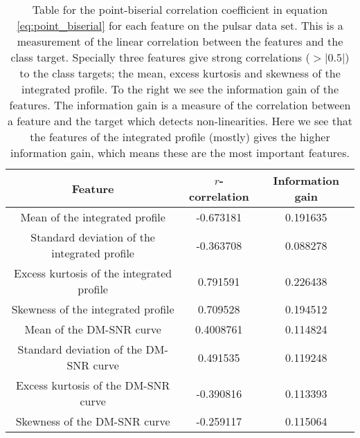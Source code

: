\documentclass[12pt,a4paper,english]{article}
\begin{document}
\begin{table}[htbp!]
	\centering
	\begin{tabular}{ |c|c|c| }
		\hline \rule{0pt}{13pt}
		Feature & $r$-correlation & Information gain \\
		\hline \rule{0pt}{13pt}
		Mean of the integrated profile & -0.673181 & 0.191635 \\
		\hline \rule{0pt}{13pt}
		Standard deviation of the integrated profile & -0.363708 & 0.088278 \\
		\hline \rule{0pt}{13pt}
		Excess kurtosis of the integrated profile & 0.791591 & 0.226438 \\
		\hline \rule{0pt}{13pt}
		Skewness of the integrated profile & 0.709528 & 0.194512 \\
		\hline \rule{0pt}{13pt}
		Mean of the DM-SNR curve & 0.4008761 & 0.114824 \\
		\hline \rule{0pt}{13pt}
		Standard deviation of the DM-SNR curve & 0.491535 & 0.119248 \\
		\hline \rule{0pt}{13pt}
		Excess kurtosis of the DM-SNR curve & -0.390816 & 0.113393 \\
		\hline \rule{0pt}{13pt}
		Skewness of the DM-SNR curve & -0.259117 &0.115064 \\
		\hline
	\end{tabular}	
	\caption{Table for the point-biserial correlation coefficient in equation \ref{eq:point_biserial} for each feature on the pulsar data set. This is a measurement of the linear correlation between the features and the class target. Specially three features give strong correlations ($>|0.5|$) to the class targets; the mean, excess kurtosis and skewness of the integrated profile. To the right we see the information gain of the features. The information gain is a measure of the correlation between a feature and the target which detects non-linearities. Here we see that the features of the integrated profile (mostly) gives the higher information gain, which means these are the most important features. \label{tab:correlations}}
\end{table}
\end{document}
